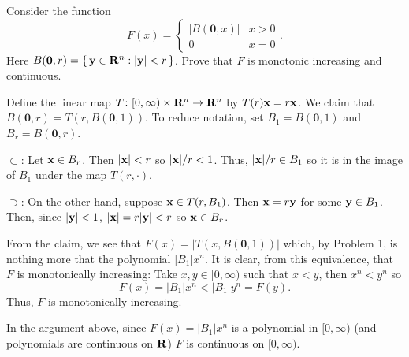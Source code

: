 \begin{problem}
  Consider the function
  \[
    F(x)=
    \begin{cases}
      |B(\mathbf{0},x)|&x>0\\
      0&x=0
    \end{cases}.
  \]
  Here $B(\mathbf{0},r)=\left\{\,\mathbf{y}\in\mathbf{R}^n:|\mathbf{y}|<r\,\right\}$. Prove
  that $F$ is monotonic increasing and continuous.
\end{problem}
\begin{solution}
  Define the linear map $T\colon[0,\infty)\times\mathbf{R}^n\to\mathbf{R}^n$ by
  $T(r)\mathbf{x}= r\mathbf{x}$. We claim that
  $B(\mathbf{0},r)=T(r,B(\mathbf{0},1))$. To reduce notation, set
  $B_1= B(\mathbf{0},1)$ and $B_r= B(\mathbf{0},r)$.
  \begin{solution}
    $\subset$: Let $\mathbf{x}\in B_r$. Then $|\mathbf{x}|<r$ so $|\mathbf{x}|/r<1$. Thus,
    $|\mathbf{x}|/r\in B_1$ so it is in the image of $B_1$ under the map
    $T(r,\cdot)$.

    $\supset$: On the other hand, suppose $\mathbf{x}\in T(r,B_1)$. Then
    $\mathbf{x}=r\mathbf{y}$ for some $\mathbf{y}\in B_1$. Then, since $|\mathbf{y}|<1$,
    $|\mathbf{x}|=r|\mathbf{y}|<r$ so $\mathbf{x}\in B_r$.
  \end{solution}

  From the claim, we see that $F(x)=|T(x,B(\mathbf{0},1))|$ which, by
  Problem 1, is nothing more that the polynomial $|B_1|x^n$. It is clear,
  from this equivalence, that $F$ is monotonically increasing: Take
  $x,y\in[0,\infty)$ such that $x<y$, then $x^n<y^n$ so
  \begin{equation}
    \label{eq:prep:1:7}
    F(x)=|B_1|x^n<|B_1|y^n=F(y).
  \end{equation}
  Thus, $F$ is monotonically increasing.

  In the argument above, since $F(x)=|B_1|x^n$ is a polynomial in
  $[0,\infty)$ (and polynomials are continuous on $\mathbf{R}$) $F$ is continuous
  on $[0,\infty)$.
\end{solution}

